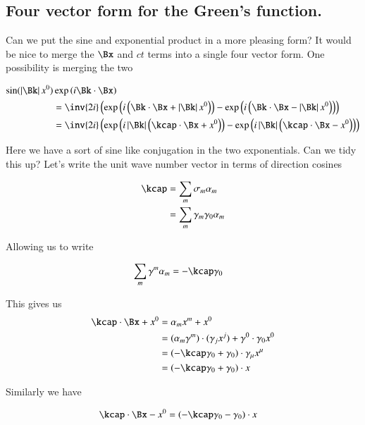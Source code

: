 \subsection{Four vector form for the Green's function. }

Can we put the sine and exponential product in a more pleasing form?  It would be nice to merge the $\Bx$ and $ct$ terms into a 
single four vector form.  One possibility is merging the two

\begin{align*}
\sin( \Abs{\Bk} x^0 ) &\exp\left( i \Bk \cdot \Bx \right) \\
&=
\inv{2i} \left(
\exp\left( i \left( \Bk \cdot \Bx +\Abs{\Bk} x^0 \right) \right)
-\exp\left( i \left( \Bk \cdot \Bx -\Abs{\Bk} x^0 \right) \right)
\right) \\
&=
\inv{2i} \left(
\exp\left( i \Abs{\Bk} \left( \kcap \cdot \Bx + x^0 \right) \right)
-\exp\left( i \Abs{\Bk} \left( \kcap \cdot \Bx - x^0 \right) \right)
\right)
\end{align*}

Here we have a sort of sine like conjugation in the two exponentials.  Can we tidy this up?  Let's write the unit wave number
vector in terms of direction cosines

\begin{align*}
\kcap 
&= \sum_m \sigma_m \alpha_m \\
&= \sum_m \gamma_m \gamma_0 \alpha_m \\
\end{align*}

Allowing us to write

\begin{align*}
\sum_m \gamma^m \alpha_m &= -\kcap \gamma_0
\end{align*}

This gives us
\begin{align*}
\kcap \cdot \Bx + x^0 
&= \alpha_m x^m + x^0 \\
&= (\alpha_m \gamma^m) \cdot (\gamma_j x^j) + \gamma^0 \cdot \gamma_0 x^0 \\
&= (-\kcap \gamma_0 + \gamma_0) \cdot \gamma_\mu x^\mu \\
&= (-\kcap \gamma_0 + \gamma_0) \cdot x
\end{align*}

Similarly we have

\begin{align*}
\kcap \cdot \Bx - x^0  &= (-\kcap \gamma_0 - \gamma_0) \cdot x
\end{align*}

